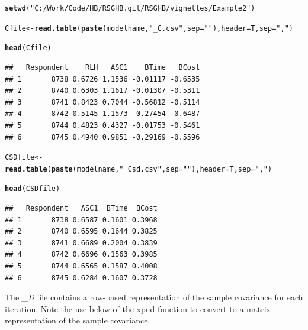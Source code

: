 \documentclass{article}\usepackage{graphicx, color}
\makeatletter
\newcommand{\hlfunctioncall}[1]{\textcolor[rgb]{0.501960784313725,0,0.329411764705882}{\textbf{#1}}}%
\newcommand{\hlstring}[1]{\textcolor[rgb]{0.6,0.6,1}{#1}}%
\newenvironment{kframe}{%
 \def\at@end@of@kframe{}%
 \ifinner\ifhmode%
  \def\at@end@of@kframe{\end{minipage}}%
  \begin{minipage}{\columnwidth}%
 \fi\fi%
 \def\FrameCommand##1{\hskip\@totalleftmargin \hskip-\fboxsep
 \colorbox{shadecolor}{##1}\hskip-\fboxsep
     \hskip-\linewidth \hskip-\@totalleftmargin \hskip\columnwidth}%
 \MakeFramed {\advance\hsize-\width
   \@totalleftmargin\z@ \linewidth\hsize
   \@setminipage}}%
 {\par\unskip\endMakeFramed%
 \at@end@of@kframe}
\newenvironment{knitrout}{}{} %
\makeatother
\begin{document}
\begin{knitrout}
\color{fgcolor}\begin{kframe}
\begin{alltt}

\hlfunctioncall{setwd}(\hlstring{"C:/Work/Code/HB/RSGHB.git/RSGHB/vignettes/Example2"})

Cfile <- \hlfunctioncall{read.table}(\hlfunctioncall{paste}(modelname, \hlstring{"_C.csv"}, sep = \hlstring{""}), header = T, sep = \hlstring{","})

\hlfunctioncall{head}(Cfile)
\end{alltt}
\begin{verbatim}
##   Respondent    RLH   ASC1    BTime   BCost
## 1       8738 0.6726 1.1536 -0.01117 -0.6535
## 2       8740 0.6303 1.1617 -0.01307 -0.5311
## 3       8741 0.8423 0.7044 -0.56812 -0.5114
## 4       8742 0.5145 1.1573 -0.27454 -0.6487
## 5       8744 0.4823 0.4327 -0.01753 -0.5461
## 6       8745 0.4940 0.9851 -0.29169 -0.5596
\end{verbatim}
\begin{alltt}

CSDfile <- \hlfunctioncall{read.table}(\hlfunctioncall{paste}(modelname, \hlstring{"_Csd.csv"}, sep = \hlstring{""}), header = T, sep = \hlstring{","})

\hlfunctioncall{head}(CSDfile)
\end{alltt}
\begin{verbatim}
##   Respondent   ASC1  BTime  BCost
## 1       8738 0.6587 0.1601 0.3968
## 2       8740 0.6595 0.1644 0.3825
## 3       8741 0.6689 0.2004 0.3839
## 4       8742 0.6696 0.1563 0.3985
## 5       8744 0.6565 0.1587 0.4008
## 6       8745 0.6284 0.1607 0.3728
\end{verbatim}
\end{kframe}
\end{knitrout}



The \emph{\_D} file contains a row-based representation of the sample covariance for each iteration. Note the use below of the xpnd function to convert to a matrix representation of the sample covariance.
\end{document}
